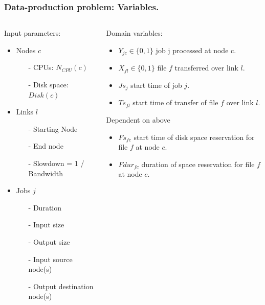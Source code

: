 \documentclass{beamer}
\begin{document}
\begin{frame}\frametitle{Data-production problem: Variables.}
\begin{columns}[c] %
\hspace{-4cm}
\begin{block}{Input parameters:}
\begin{itemize}
\item Nodes $c$
\begin{itemize}
\item[-] CPUs: $N_{CPU}(c)$
\item[-] Disk space: $Disk(c)$
\end{itemize}

\item Links $l$
\begin{itemize}
\item[-] Starting Node
\item[-] End node
\item[-] Slowdown = 1 / Bandwidth
\end{itemize}

\item Jobs $j$
\begin{itemize}
\item[-] Duration
\item[-] Input size
\item[-] Output size
\item[-] Input source node(s)
\item[-] Output destination node(s)
\end{itemize}

\end{itemize}
 	\end{block}
 	
\vspace{-4mm}
\begin{block}{Domain variables:}
\begin{itemize}
\item $Y_{jc} \in \{0,1\}$ job j processed at node c. 
\item $X_{fl} \in \{0,1\}$  file $f$ transferred over link $l$.
\item $Js_{j}$ start time of job $j$.
\item $Ts_{fl}$ start time of transfer of file $f$ over link $l$.
\end{itemize}
Dependent on above
\begin{itemize}
\item $Fs_{fc}$ start time of disk space reservation for file $f$ at node $c$.
\item $Fdur_{fc}$ duration of space reservation for file $f$ at node $c$.
\end{itemize}
 	\end{block}
\end{columns} 	

\end{frame}
\end{document}
